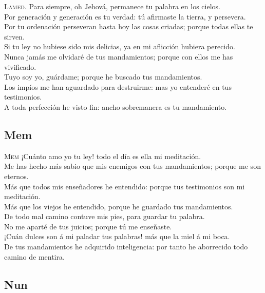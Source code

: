  \textsc{Lamed}. Para siempre, oh Jehová, permanece tu
palabra en los cielos.\\
 Por generación y generación es tu verdad: tú afirmaste
la tierra, y persevera.\\
 Por tu ordenación perseveran hasta hoy las cosas
criadas; porque todas ellas te sirven.\\
 Si tu ley no hubiese sido mis delicias, ya en mi
aflicción hubiera perecido.\\
 Nunca jamás me olvidaré de tus mandamientos; porque con
ellos me has vivificado.\\
 Tuyo soy yo, guárdame; porque he buscado tus
mandamientos.\\
 Los impíos me han aguardado para destruirme: mas yo
entenderé en tus testimonios.\\
 A toda perfección he visto fin: ancho sobremanera es tu
mandamiento.

\hypertarget{mem}{%
\subsection{Mem}\label{mem}}

 \textsc{Mem} ¡Cuánto amo yo tu ley! todo el día es ella
mi meditación.\\
 Me has hecho más sabio que mis enemigos con tus
mandamientos; porque me son eternos.\\
 Más que todos mis enseñadores he entendido: porque tus
testimonios son mi meditación.\\
 Más que los viejos he entendido, porque he guardado tus
mandamientos.\\
 De todo mal camino contuve mis pies, para guardar tu
palabra.\\
 No me aparté de tus juicios; porque tú me enseñaste.\\
 ¡Cuán dulces son á mi paladar tus palabras! más que la
miel á mi boca.\\
 De tus mandamientos he adquirido inteligencia: por
tanto he aborrecido todo camino de mentira.

\hypertarget{nun}{%
\subsection{Nun}\label{nun}}

